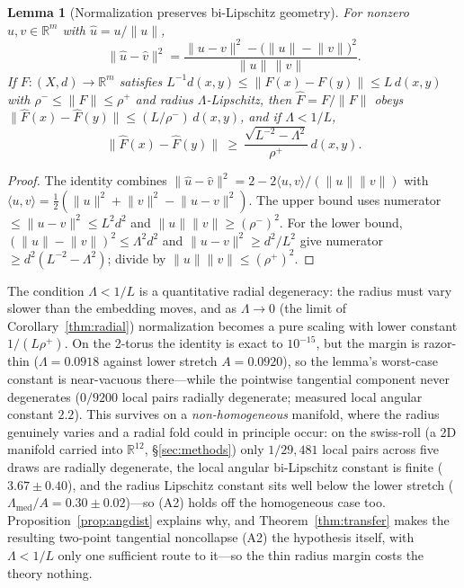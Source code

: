 \documentclass[11pt]{article}
\newtheorem{lemma}[theorem]{Lemma}
\theoremstyle{remark}
\begin{document}
\begin{lemma}[Normalization preserves bi-Lipschitz geometry]\label{lem:norm}
For nonzero $u,v\in\mathbb{R}^m$ with $\hat u=u/\lVert u\rVert$,
\[
\lVert\hat u-\hat v\rVert^2
=\frac{\lVert u-v\rVert^2-\big(\lVert u\rVert-\lVert v\rVert\big)^2}
      {\lVert u\rVert\,\lVert v\rVert}.
\]
If $F:(X,d)\to\mathbb{R}^m$ satisfies $L^{-1}d(x,y)\le\lVert F(x)-F(y)\rVert\le
L\,d(x,y)$ with $\rho^-\le\lVert F\rVert\le\rho^+$ and radius $\Lambda$-Lipschitz,
then $\hat F=F/\lVert F\rVert$ obeys $\lVert\hat F(x)-\hat F(y)\rVert\le
(L/\rho^-)\,d(x,y)$, and if $\Lambda<1/L$,
\[
\lVert\hat F(x)-\hat F(y)\rVert\ \ge\ \frac{\sqrt{L^{-2}-\Lambda^2}}{\rho^+}\,d(x,y).
\]
\end{lemma}

\begin{proof}
The identity combines $\lVert\hat u-\hat v\rVert^2=2-2\langle u,v\rangle/
(\lVert u\rVert\lVert v\rVert)$ with $\langle u,v\rangle=\tfrac12(\lVert u\rVert^2
+\lVert v\rVert^2-\lVert u-v\rVert^2)$. The upper bound uses numerator
$\le\lVert u-v\rVert^2\le L^2d^2$ and $\lVert u\rVert\lVert v\rVert\ge(\rho^-)^2$.
For the lower bound, $(\lVert u\rVert-\lVert v\rVert)^2\le\Lambda^2d^2$ and
$\lVert u-v\rVert^2\ge d^2/L^2$ give numerator $\ge d^2(L^{-2}-\Lambda^2)$;
divide by $\lVert u\rVert\lVert v\rVert\le(\rho^+)^2$.
\end{proof}

The condition $\Lambda<1/L$ is a quantitative radial degeneracy: the radius
must vary slower than the embedding moves, and as $\Lambda\to0$ (the limit of
Corollary~\ref{thm:radial}) normalization becomes a pure scaling with lower
constant $1/(L\rho^+)$. On the 2-torus the identity is exact to $10^{-15}$,
but the margin is razor-thin ($\Lambda=0.0918$ against lower stretch
$A=0.0920$), so the lemma's worst-case constant is near-vacuous there---while
the pointwise tangential component never degenerates ($0/9200$ local pairs
radially degenerate; measured local angular constant $2.2$). This survives on a
\emph{non-homogeneous} manifold, where the radius genuinely varies and a radial
fold could in principle occur: on the swiss-roll (a 2D manifold carried into
$\mathbb R^{12}$, \S\ref{sec:methods}) only $1/29{,}481$ local pairs across five
draws are radially degenerate, the local angular bi-Lipschitz constant is finite
($3.67\pm0.40$), and the radius Lipschitz constant sits well below the lower
stretch ($\Lambda_{\mathrm{med}}/A=0.30\pm0.02$)---so (A2) holds off the
homogeneous case too. Proposition~\ref{prop:angdist} explains why, and
Theorem~\ref{thm:transfer} makes the resulting two-point tangential
noncollapse (A2) the hypothesis itself, with $\Lambda<1/L$ only one
sufficient route to it---so the thin radius margin costs the theory nothing.
\end{document}
